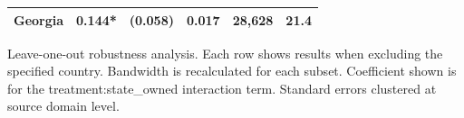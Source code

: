 \begin{table}[t]
\begin{tabular*}{\linewidth}{@{\extracolsep{\fill}}lrrrrr}
Georgia & 0.144* & (0.058) & 0.017 & 28,628 & 21.4 \\ 
\bottomrule
\end{tabular*}
\begin{minipage}{\linewidth}
\vspace{.05em}
Leave-one-out robustness analysis. Each row shows results when excluding the
specified country. Bandwidth is recalculated for each subset. Coefficient shown
is for the treatment:state\_owned interaction term. Standard errors clustered at
source domain level.\\
\end{minipage}
\end{table}

